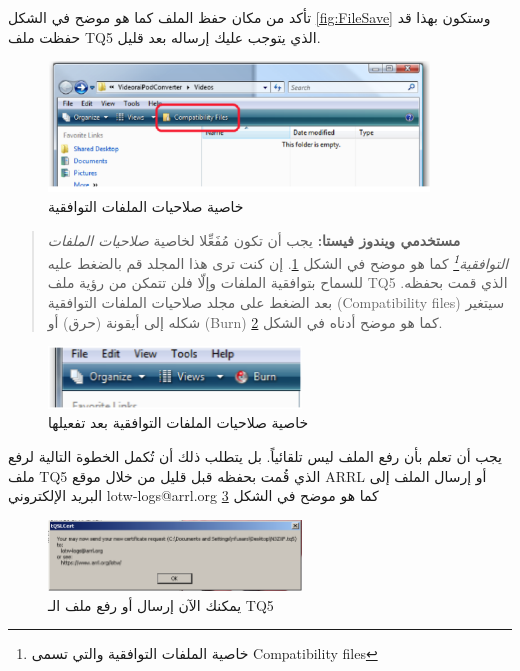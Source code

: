 \documentclass[a4paper,12pt]{article}
\begin{document}
تأكد من مكان حفظ الملف كما هو موضح في الشكل \ref{fig:FileSave} وستكون بهذا قد حفظت ملف \textenglish{TQ5} الذي يتوجب عليك
إرساله بعد قليل.

\newpage
				\begin{figure}[!hbtp]
				\centering
				\includegraphics[width=0.9\textwidth]{compatbefore.eps}
				\caption{خاصية صلاحيات الملفات التوافقية}
				\label{fig:Compat}
				\end{figure}
\begin{quote}
\textbf{مستخدمي ويندوز فيستا:} يجب أن تكون مُفَعِّلا لخاصية \emph{صلاحيات الملفات التوافقية\footnote{خاصية الملفات التوافقية والتي تسمى \textenglish{Compatibility files}}} كما هو موضح في الشكل \ref{fig:Compat}.
إن كنت ترى هذا المجلد قم بالضغط عليه للسماح بتوافقية الملفات وإلّا فلن
تتمكن من رؤية ملف \textenglish{TQ5} الذي قمت بحفظه. بعد الضغط على مجلد صلاحيات الملفات التوافقية (\textenglish{Compatibility files}) سيتغير شكله إلى أيقونة (حرق) أو (\textenglish{Burn}) كما هو موضح أدناه في الشكل \ref{fig:CompatAft}.
\end{quote}

				\begin{figure}[!hbtp]
				\centering
				\includegraphics[width=0.6\textwidth]{compatafter.eps}
				\caption{خاصية صلاحيات الملفات التوافقية بعد تفعيلها}
				\label{fig:CompatAft}
				\end{figure}

\vspace{18pt}
\begin{center}
	\color{slategray2}
{\Huge \decoone}
\end{center}

			\clearpage
يجب أن تعلم بأن رفع الملف ليس تلقائياً. بل يتطلب ذلك أن تُكمل الخطوة التالية لرفع
ملف \textenglish{TQ5} الذي قُمت بحفظه قبل قليل من خلال موقع \textenglish{ARRL} أو إرسال الملف إلى
البريد الإلكتروني lotw-logs@arrl.org كما هو موضح في الشكل \ref{fig:Send}
\\
				\begin{figure}[!hbtp]
				\centering
				\includegraphics[width=0.6\textwidth]{csrsend.eps}
				\caption{يمكنك الآن إرسال أو رفع ملف الـ TQ5}
				\label{fig:Send}
				\end{figure}
\end{document}
